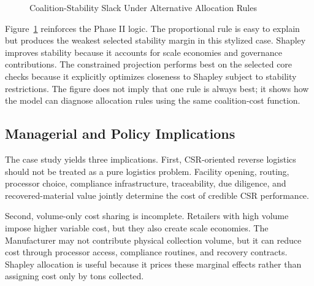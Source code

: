 \begin{figure}[htbp]
\centering
{}
\caption{Coalition-Stability Slack Under Alternative Allocation Rules}
\label{fig:ch4_allocation_slack}
\end{figure}

Figure~\ref{fig:ch4_allocation_slack} reinforces the Phase II logic. The proportional rule is easy to explain but produces the weakest selected stability margin in this stylized case. Shapley improves stability because it accounts for scale economies and governance contributions. The constrained projection performs best on the selected core checks because it explicitly optimizes closeness to Shapley subject to stability restrictions. The figure does not imply that one rule is always best; it shows how the model can diagnose allocation rules using the same coalition-cost function.

\subsection{Managerial and Policy Implications}

The case study yields three implications. First, CSR-oriented reverse logistics should not be treated as a pure logistics problem. Facility opening, routing, processor choice, compliance infrastructure, traceability, due diligence, and recovered-material value jointly determine the cost of credible CSR performance.

Second, volume-only cost sharing is incomplete. Retailers with high volume impose higher variable cost, but they also create scale economies. The Manufacturer may not contribute physical collection volume, but it can reduce cost through processor access, compliance routines, and recovery contracts. Shapley allocation is useful because it prices these marginal effects rather than assigning cost only by tons collected.


